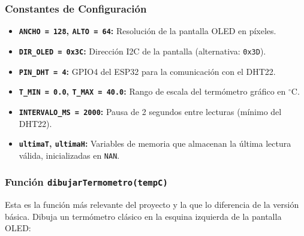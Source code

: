 \documentclass[12pt,a4paper]{article}
\begin{document}
\subsubsection*{Constantes de Configuración}
\begin{itemize}
    \item \textbf{\texttt{ANCHO = 128}, \texttt{ALTO = 64}:} Resolución de la pantalla OLED en píxeles.
    \item \textbf{\texttt{DIR\_OLED = 0x3C}:} Dirección I2C de la pantalla (alternativa: \texttt{0x3D}).
    \item \textbf{\texttt{PIN\_DHT = 4}:} GPIO4 del ESP32 para la comunicación con el DHT22.
    \item \textbf{\texttt{T\_MIN = 0.0}, \texttt{T\_MAX = 40.0}:} Rango de escala del termómetro gráfico en $^\circ$C.
    \item \textbf{\texttt{INTERVALO\_MS = 2000}:} Pausa de 2 segundos entre lecturas (mínimo del DHT22).
    \item \textbf{\texttt{ultimaT}, \texttt{ultimaH}:} Variables de memoria que almacenan la última lectura válida, inicializadas en \texttt{NAN}.
\end{itemize}

\subsubsection*{Función \texttt{dibujarTermometro(tempC)}}
Esta es la función más relevante del proyecto y la que lo diferencia de la versión básica. Dibuja un termómetro clásico en la esquina izquierda de la pantalla OLED:
\end{document}
